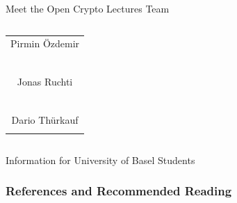\documentclass[handout]{beamer}
\begin{document}
\begin{frame}{Meet the Open Crypto Lectures Team}
\begin{columns}[T]
\begin{column}{0.31\textwidth}
\begin{table}
\begin{tabular}{c}
					Pirmin Özdemir\\
					\href{https://www.linkedin.com/in/pirmin-\%C3\%B6zdemir-539845159/}{\faLinkedinSquare}\ \href{https://twitter.com/Pirmin15}{\faTwitterSquare}\\
					\vspace{0.5em}\\
					Jonas Ruchti\\
					\href{https://linkedin.com/in/jonas-ruchti-a29042221}{\faLinkedinSquare}\ \href{https://twitter.com/jonas_ruchti}{\faTwitterSquare}\\
					\vspace{0.5em}\\
					Dario Thürkauf\\
					\href{https://linkedin.com/in/dario-thuerkauf/}{\faLinkedinSquare} \href{https://twitter.com/dario_thuerkauf}{\faTwitterSquare}\\
				\end{tabular}
			\end{table}
		\end{column}
	\end{columns}
\end{frame}

\begin{frame}{Information for University of Basel Students}

	

	

\vspace{1em}


\end{frame}

\begin{frame}%
\frametitle{References and Recommended Reading}
	
	
\end{frame}
\end{document}
